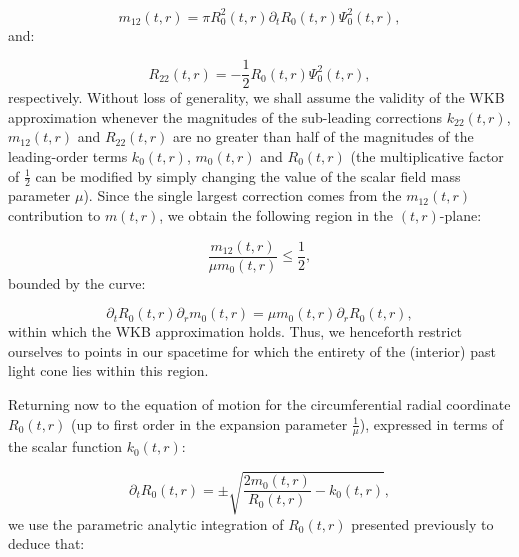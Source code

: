 \documentclass{article}
\begin{document}
\begin{equation}
m_{1 2} \left( t, r \right) = \pi R_{0}^{2} \left( t, r \right) \partial_t R_0 \left( t, r \right) \Psi_{0}^{2} \left( t, r \right),
\end{equation}
and:

\begin{equation}
R_{2 2} \left( t, r \right) = - \frac{1}{2} R_0 \left( t, r \right) \Psi_{0}^{2} \left( t, r \right),
\end{equation}
respectively. Without loss of generality, we shall assume the validity of the WKB approximation whenever the magnitudes of the sub-leading corrections ${k_{2 2} \left( t, r \right)}$, ${m_{1 2} \left( t, r \right)}$ and ${R_{2 2} \left( t, r \right)}$ are no greater than half of the magnitudes of the leading-order terms ${k_0 \left( t, r \right)}$, ${m_0 \left( t, r \right)}$ and ${R_0 \left( t, r \right)}$ (the multiplicative factor of ${\frac{1}{2}}$ can be modified by simply changing the value of the scalar field mass parameter ${\mu}$). Since the single largest correction comes from the ${m_{1 2} \left( t, r \right)}$ contribution to ${m \left( t, r \right)}$, we obtain the following region in the ${\left( t, r \right)}$-plane:

\begin{equation}
\frac{m_{1 2} \left( t, r \right)}{\mu m_0 \left( t, r \right)} \leq \frac{1}{2},
\end{equation}
bounded by the curve:

\begin{equation}
\partial_t R_0 \left( t, r \right) \partial_r m_0 \left( t, r \right) = \mu m_0 \left( t, r \right) \partial_r R_0 \left( t, r \right),
\end{equation}
within which the WKB approximation holds. Thus, we henceforth restrict ourselves to points in our spacetime for which the entirety of the (interior) past light cone lies within this region.

Returning now to the equation of motion for the circumferential radial coordinate ${R_0 \left( t, r \right)}$ (up to first order in the expansion parameter ${\frac{1}{\mu}}$), expressed in terms of the scalar function ${k_0 \left( t, r \right)}$:

\begin{equation}
\partial_t R_0 \left( t, r \right) = \pm \sqrt{\frac{2 m_0 \left( t, r \right)}{R_0 \left( t, r \right)} - k_0 \left( t, r \right)},
\end{equation}
we use the parametric analytic integration of ${R_0 \left( t, r \right)}$ presented previously to deduce that:
\end{document}
